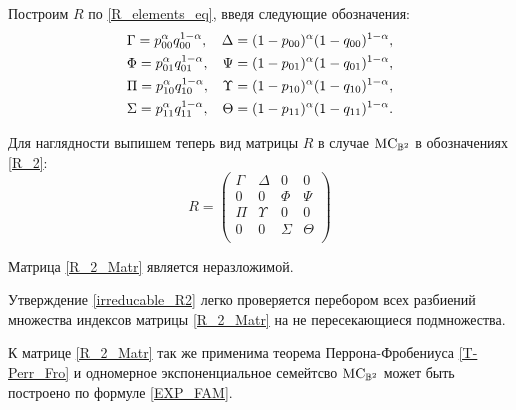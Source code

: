 Построим $R$ по \eqref{R_elements_eq}, введя следующие обозначения:
\begin{align}
\label{R_2}
& \Gamma = p_{00}^\alpha q_{00}^{1 - \alpha}, & \Delta = (1 - p_{00})^\alpha(1 - q_{00})^{1 - \alpha}, \nonumber \\
& \Phi = p_{01}^\alpha q_{01}^{1 - \alpha}, & \Psi = (1 - p_{01})^\alpha(1 - q_{01})^{1 - \alpha}, \nonumber \\
& \Pi = p_{10}^\alpha q_{10}^{1 - \alpha}, & \Upsilon = (1 - p_{10})^\alpha(1 - q_{10})^{1 - \alpha}, \nonumber \\
& \Sigma = p_{11}^\alpha q_{11}^{1 - \alpha}, & \Theta = (1 - p_{11})^\alpha(1 - q_{11})^{1 - \alpha}. 
\end{align}

Для наглядности выпишем теперь вид матрицы $R$ в случае $\mathrm{MC}_{\mathbb{B}^2}$ в обозначениях \eqref{R_2}:
\begin{equation} \label{R_2_Matr}
R = 
\begin{pmatrix}
\Gamma & \Delta & 0 & 0 \\
0 & 0 & \Phi & \Psi \\
\Pi & \Upsilon & 0 & 0 \\
0 & 0 & \Sigma & \Theta \\
\end{pmatrix}
\end{equation}

\begin{ass}
\label{irreducable_R2}
Матрица \eqref{R_2_Matr} является неразложимой. 
\end{ass}

Утверждение \ref{irreducable_R2} легко проверяется перебором всех разбиений множества индексов матрицы \eqref{R_2_Matr} на не пересекающиеся подмножества. 

К матрице \eqref{R_2_Matr} так же применима теорема Перрона-Фробениуса \ref{T-Perr_Fro} и одномерное экспоненциальное семейтсво $\mathrm{MC}_{\mathbb{B}^{2}}$ может быть построено по формуле \eqref{EXP_FAM}. %

